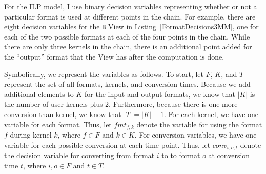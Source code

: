 \documentclass{article}
\begin{document}
For the ILP model, I use binary decision variables representing whether or not a particular format is used at different points in the chain. 
For example, there are eight decision variables for the \verb.B. View in Listing~\ref{FormatDecisions3MM}, one for each of the two possible formats at each of the four points in the chain. 
While there are only three kernels in the chain, there is an additional point added for the \enquote{output} format that the View has after the computation is done.

Symbolically, we represent the variables as follows.
To start, let $F$, $K$, and $T$ represent the set of all formats, kernels, and conversion times.
Because we add additional elements to $K$ for the input and output formats, we know that $|K|$ is the number of user kernels plus 2.
Furthermore, because there is one more conversion than kernel, we know that $|T| = |K| + 1$.
For each kernel, we have one variable for each format. 
Thus, let $fmt_{f,k}$ denote the variable for using the format $f$ during kernel $k$, where $f \in F$ and $k \in K$.
For conversion variables, we have one variable for each possible conversion at each time point. 
Thus, let $conv_{i,o,t}$ denote the decision variable for converting from format $i$ to to format $o$ at conversion time $t$, where $i,o \in F$ and $t \in T$.
\end{document}
